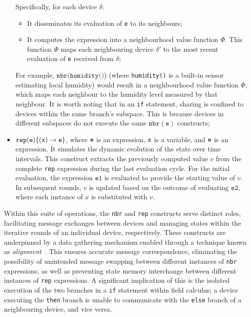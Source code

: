 \begin{itemize}
     Specifically, for each device $\delta$:
    \begin{itemize}
        \item It disseminates its evaluation of \texttt{e} to its neighbours;
        \item It computes the expression into a neighbourhood value function $\Phi$. This function $\Phi$ maps each neighbouring device $\delta'$ to the most recent evaluation of \texttt{e} received from $\delta$;
    \end{itemize}
    For example, $\texttt{nbr}(\texttt{humidity()}$) (where \texttt{humidity()} is a built-in sensor estimating local humidity) would result in a neighbourhood value function $\Phi$, 
    which maps each neighbour to the humidity level measured by that neighbour. 
    It is worth noting that in an \texttt{if} statement, 
    sharing is confined to devices within the same branch's subspace.
    This is because devices in different subspaces do not execute the same $\texttt{nbr}(\texttt{e})$ constructs;
    \item $\texttt{rep}(\texttt{e})\{(\texttt{x}) \rightarrow \texttt{e}\}$, where $\texttt{e}$ is an expression, $\texttt{x}$ is a variable, and $\texttt{e}$ is an expression. 
    It simulates the dynamic evolution of the state over time intervals. 
    This construct extracts the previously computed value \( v \) from the complete \texttt{rep} expression during the last evaluation cycle. 
    For the initial evaluation, the expression \( \texttt{e1} \) is evaluated to provide the starting value of \( v \). In subsequent rounds, 
    \( v \) is updated based on the outcome of evaluating \( \texttt{e2} \),
    where each instance of \( x \) is substituted with \( v \).
\end{itemize}
Within this suite of operations, 
 the \texttt{nbr} and \texttt{rep} constructs serve distinct roles, 
 facilitating message exchanges between devices and managing states within the iterative rounds of an individual device, respectively. 
%
These constructs are underpinned by a data gathering mechanism enabled through a technique known as \emph{alignment}~\cite{audrito2016run}. 
This ensures accurate message correspondence, 
 eliminating the possibility of unintended message swapping between different instances of \texttt{nbr} expressions, 
 as well as preventing state memory interchange between different instances of \texttt{rep} expressions. 
% 
A significant implication of this is the isolated execution of the two branches in a \texttt{if} statement within field calculus; 
  a device executing the \texttt{then} branch is unable to communicate with the \texttt{else} branch of a neighbouring device, and vice versa.
%
